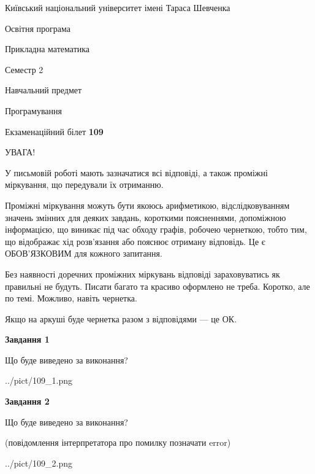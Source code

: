 \documentclass[12pt, ukrainian]{article}
\begin{document}
{{\begin {small}\par
{ \center  Київський національний університет імені Тараса Шевченка \par}
{\parbox {5 cm}{Освітня програма \hfill}{\parbox {7 cm}{Прикладна математика\hfill}}\parbox {6 cm}{\hfill Семестр 2}}\par
{\parbox {5 cm} {Навчальний предмет \hfill}\parbox {7 cm}{Програмування \hfill}\parbox {6cm}{\hfill}\par}\vspace{-7pt} \end{small}}{\center Екзаменаційний білет \No \textbf
{ 109 }\par}}
{
\begin {large}
УВАГА!

У письмовій роботі мають зазначатися всі відповіді, а також проміжні міркування, що передували їх отриманню.

Проміжні міркування можуть бути якоюсь арифметикою, відслідковуванням зна\-чень змінних для деяких завдань,
короткими поясненнями, допоміжною інформацією, що виникає під час обходу графів, робочею чернеткою,
тобто тим, що відображає хід розв’язання або пояснює отриману відповідь.
Це є ОБОВ’ЯЗКОВИМ для кожного запитання.

Без наявності доречних проміжних міркувань відповіді зараховуватись як правиль\-ні не будуть.
Писати багато та красиво оформлено не треба. Коротко, але по темі. Можли\-во, навіть чернетка.

Якщо на аркуші буде чернетка разом з відповідями --- це ОК.

\newpage

{\begin {center}\textbf{Завдання 1}\end {center}}\par
Що буде виведено за виконання?\par
\begin{center}
	{../pict/109_1.png}
\end{center}
\newpage

{\begin {center}\textbf{Завдання 2}\end {center}}\par
Що буде виведено за виконання?\par
 (повідомлення інтерпретатора про помилку позначати error)\par
\begin{center}
	{../pict/109_2.png}
\end{center}
\newpage


\end{large}}
\end{document}
